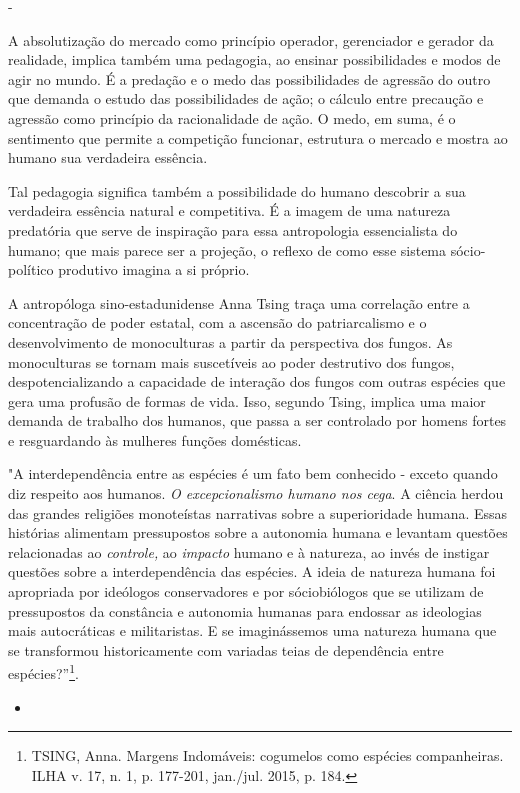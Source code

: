 -

A absolutização do mercado como princípio operador, gerenciador e
gerador da realidade, implica também uma pedagogia, ao ensinar
possibilidades e modos de agir no mundo. É a predação e o medo das
possibilidades de agressão do outro que demanda o estudo das
possibilidades de ação; o cálculo entre precaução e agressão como
princípio da racionalidade de ação. O medo, em suma, é o sentimento que
permite a competição funcionar, estrutura o mercado e mostra ao humano
sua verdadeira essência.

Tal pedagogia significa também a possibilidade do humano descobrir a sua
verdadeira essência natural e competitiva. É a imagem de uma natureza
predatória que serve de inspiração para essa antropologia essencialista
do humano; que mais parece ser a projeção, o reflexo de como esse
sistema sócio-político produtivo imagina a si próprio.

A antropóloga sino-estadunidense Anna Tsing traça uma correlação entre a
concentração de poder estatal, com a ascensão do patriarcalismo e o
desenvolvimento de monoculturas a partir da perspectiva dos fungos. As
monoculturas se tornam mais suscetíveis ao poder destrutivo dos fungos,
despotencializando a capacidade de interação dos fungos com outras
espécies que gera uma profusão de formas de vida. Isso, segundo Tsing,
implica uma maior demanda de trabalho dos humanos, que passa a ser
controlado por homens fortes e resguardando às mulheres funções
domésticas.

"A interdependência entre as espécies é um fato bem conhecido - exceto
quando diz respeito aos humanos. \emph{O excepcionalismo humano nos
cega}. A ciência herdou das grandes religiões monoteístas narrativas
sobre a superioridade humana. Essas histórias alimentam pressupostos
sobre a autonomia humana e levantam questões relacionadas ao
\emph{controle,} ao \emph{impacto} humano e à natureza, ao invés de
instigar questões sobre a interdependência das espécies. A ideia de
natureza humana foi apropriada por ideólogos conservadores e por
sóciobiólogos que se utilizam de pressupostos da constância e autonomia
humanas para endossar as ideologias mais autocráticas e militaristas. E
se imaginássemos uma natureza humana que se transformou historicamente
com variadas teias de dependência entre espécies?''\footnote{TSING,
  Anna. Margens Indomáveis: cogumelos como espécies companheiras. ILHA
  v. 17, n. 1, p. 177-201, jan./jul. 2015, p. 184.}.

\begin{itemize}
\item
\end{itemize}

